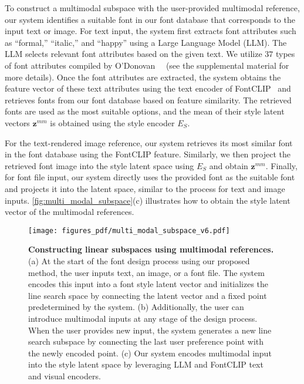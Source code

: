 To construct a multimodal subspace with the user-provided multimodal reference, our system identifies a suitable font in our font database that corresponds to the input text or image. 
For text input, the system first extracts font attributes such as ``formal,'' ``italic,'' and ``happy'' using a Large Language Model (LLM). 
The LLM selects relevant font attributes based on the given text.
We utilize $37$ types of font attributes compiled by O'Donovan~\etal~\cite{o2014exploratory} (see the supplemental material for more details).
Once the font attributes are extracted, the system obtains the feature vector of these text attributes using the text encoder of FontCLIP~\cite{tatsukawa2024fontclip} and retrieves fonts from our font database based on feature similarity. 
The retrieved fonts are used as the most suitable options, and the mean of their style latent vectors $\bm{z}^{mm}$ is obtained using the style encoder $E_{S}$.

For the text-rendered image reference, our system retrieves its most similar font in the font database using the FontCLIP feature.
Similarly, we then project the retrieved font image into the style latent space using $E_{S}$ and obtain $\bm{z}^{mm}$.
Finally, for font file input, our system directly uses the provided font as the suitable font and projects it into the latent space, similar to the process for text and image inputs.
\autoref{fig:multi_modal_subspace}(c) illustrates how to obtain the style latent vector of the multimodal references.


\begin{figure*}[ht]
    \centering
    \texttt{[image: figures\_pdf/multi\_modal\_subspace\_v6.pdf]}
    \caption{
    \textbf{Constructing linear subspaces using multimodal references.} 
    (a) At the start of the font design process using our proposed method, the user inputs text, an image, or a font file. 
    The system encodes this input into a font style latent vector and initializes the line search space by connecting the latent vector and a fixed point predetermined by the system.
    (b) Additionally, the user can introduce multimodal inputs at any stage of the design process.
    When the user provides new input, the system generates a new line search subspace by connecting the last user preference point with the newly encoded point.
    (c) Our system encodes multimodal input into the style latent space by leveraging LLM and FontCLIP text and visual encoders.
}
    \label{fig:multi_modal_subspace}
\end{figure*}

